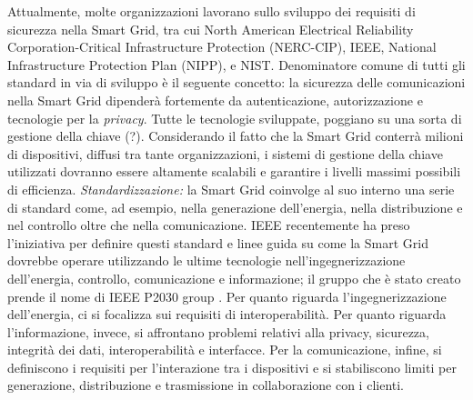 Attualmente, molte organizzazioni lavorano sullo sviluppo dei requisiti di sicurezza nella Smart Grid, tra cui North American Electrical Reliability Corporation-Critical Infrastructure Protection (NERC-CIP), IEEE, National Infrastructure Protection Plan (NIPP), e NIST. \newline 
Denominatore comune di tutti gli standard in via di sviluppo è il seguente concetto: la sicurezza delle comunicazioni nella Smart Grid dipenderà fortemente da autenticazione, autorizzazione e tecnologie per la \emph{privacy}. \newline Tutte le tecnologie sviluppate, poggiano su una sorta di gestione della chiave (?). Considerando il fatto che la Smart Grid conterrà milioni di dispositivi, diffusi tra tante organizzazioni, i sistemi di gestione della chiave utilizzati dovranno essere altamente scalabili e garantire i livelli massimi possibili di efficienza.
\newline \newline
\textit{Standardizzazione:} la Smart Grid coinvolge al suo interno una serie di standard come, ad esempio, nella generazione dell'energia, nella distribuzione e nel controllo oltre che nella comunicazione. IEEE recentemente ha preso l'iniziativa per definire questi standard e linee guida su come la Smart Grid dovrebbe operare utilizzando le ultime tecnologie nell'ingegnerizzazione dell'energia, controllo, comunicazione e informazione; il gruppo che è stato creato prende il nome di IEEE P2030 group \cite{surveymotiv}. \newline Per quanto riguarda l'ingegnerizzazione dell'energia, ci si focalizza sui requisiti di interoperabilità. Per quanto riguarda l'informazione, invece, si affrontano problemi relativi alla privacy, sicurezza, integrità dei dati, interoperabilità e interfacce. Per la comunicazione, infine, si definiscono i requisiti per l'interazione tra i dispositivi e si stabiliscono limiti per generazione, distribuzione e trasmissione in collaborazione con i clienti.
 

